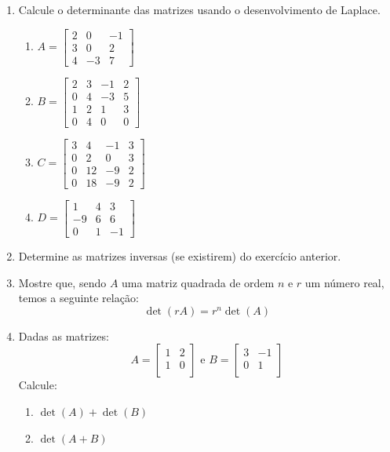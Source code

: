 \documentclass[oneside,a4paper,12pt]{article}
\begin{document}
\begin{enumerate}
	\item Calcule o determinante das matrizes usando o desenvolvimento de Laplace.
	\begin{multicols}{2}
	\begin{enumerate}
			\item $A=\left[
			\begin{array}{ccc}
			2	&	0	&	-1	\\
			3	&	0	&	2	\\
			4	&	-3	&	7
			\end{array}
			\right]
			$
			\item $B=\left[
			\begin{array}{cccc}
			2	&	3	&	-1	&	2	\\
			0	&	4	&	-3	&	5	\\
			1	&	2	&	1	&	3	\\
			0	&	4	&	0	&	0
			\end{array}
			\right]
			$
			\item $C=\left[
			\begin{array}{cccc}
			3	&	4	&	-1	&	3	\\
			0	&	2	&	0	&	3	\\
			0	&	12	&	-9	&	2	\\
			0	&	18	&	-9	&	2
			\end{array}
			\right]
			$
			\item $D=\left[
			\begin{array}{ccc}
			1	&	4	&	3	\\
			-9	&	6	&	6	\\
			0	&	1	&	-1
			\end{array}
			\right]
			$
	\end{enumerate}
	\end{multicols}

	\item Determine as matrizes inversas (se existirem) do exercício anterior.
	
	\item Mostre que, sendo $A$ uma matriz quadrada de ordem $n$ e $r$ um número real, temos a seguinte relação:
	$$\det(rA) = r^{n}\det(A)$$
	
	\item Dadas as matrizes:
	$$
	A=\left[
	\begin{array}{cc}
	1	&	2	\\
	1	&	0	\\
	\end{array}
	\right]
	\text{ e }
	B=\left[
	\begin{array}{cc}
	3	&	-1	\\
	0	&	1	\\
	\end{array}
	\right]
	$$
	Calcule:
	\begin{enumerate}
		\item $\det(A) + \det(B)$
		\item $\det(A+B)$
	\end{enumerate}


\end{enumerate}
\end{document}
